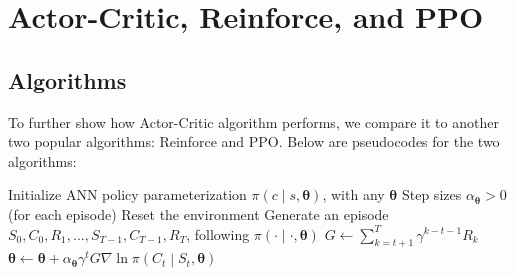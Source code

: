 \documentclass[11pt]{article}
\begin{document}
\section{Actor-Critic, Reinforce, and PPO}
\subsection{Algorithms}
To further show how Actor-Critic algorithm performs, we compare it to another
two popular algorithms: Reinforce and PPO. Below are pseudocodes for the two
algorithms:
\begin{algorithm}[H]
\caption{Reinforce for our financial problem}
\begin{algorithmic}[1]
\State Initialize ANN policy parameterization 
\(\pi\left(c\middle|s, \bm{\theta}\right)\), with any \(\bm{\theta}\)
\State Step sizes \(\alpha_{\bm{\theta}}>0\)
\Loop \hspace{0.3mm} (for each episode)
    \State Reset the environment
    \State Generate an episode \(S_0, C_0, R_1, ..., S_{T-1}, C_{T-1}, R_T\),
    following \(\pi\left(\cdot\middle|\cdot, \bm{\theta}\right)\)
        \State \(G \gets \sum_{k=t+1}^{T} \gamma^{k-t-1}R_k\)
        \State \(\bm{\theta} \gets \bm{\theta} + \alpha_{\bm{\theta}}\gamma^t
        G\nabla{\ln{\pi\left(C_t\middle|S_t, \bm{\theta}\right)}}\)
    \EndFor
\EndLoop
\end{algorithmic}
\end{algorithm}
\end{document}
